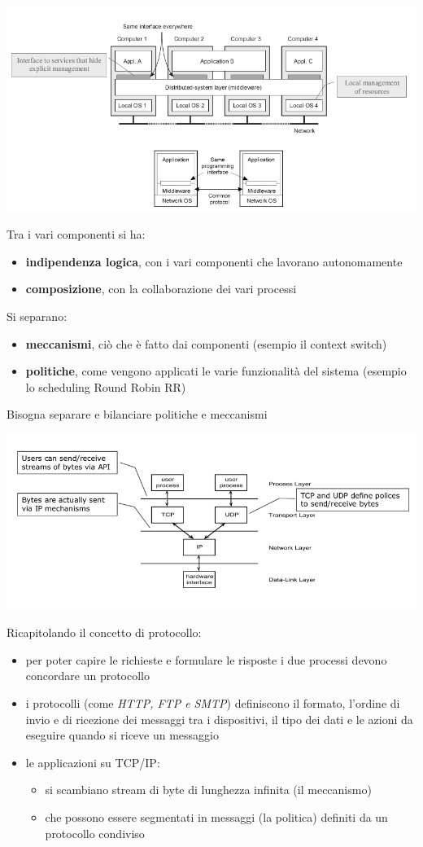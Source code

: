 \documentclass[a4paper,12pt, oneside]{book}
\begin{document}
\begin{center}
\includegraphics[scale=2]{img/cli4.png}
\end{center}
Tra i vari componenti si ha:
\begin{itemize}
\item \textbf{indipendenza logica}, con i vari componenti che lavorano autonomamente
\item \textbf{composizione}, con la collaborazione dei vari processi
\end{itemize}
Si separano:
\begin{itemize}
\item \textbf{meccanismi}, ciò che è fatto dai componenti (esempio il context switch)
\item \textbf{politiche}, come vengono applicati le varie funzionalità del sistema (esempio lo scheduling Round Robin RR)
\end{itemize}
Bisogna separare e bilanciare politiche e meccanismi
\begin{center}
\includegraphics[scale=2]{img/cli5.png}
\end{center}
Ricapitolando il concetto di protocollo:
\begin{itemize}
\item per poter capire le richieste e formulare le risposte i due processi devono concordare un protocollo
\item i protocolli (come \textit{HTTP, FTP e SMTP}) definiscono il formato, l'ordine di invio e di ricezione dei messaggi tra i dispositivi, il tipo dei dati e le azioni da eseguire quando si riceve un messaggio
\item le applicazioni su TCP/IP:
\begin{itemize}
\item si scambiano stream di byte di lunghezza infinita (il meccanismo)
\item che possono essere segmentati in messaggi (la politica) definiti da un protocollo condiviso
\end{itemize}
\end{itemize}
\end{document}
